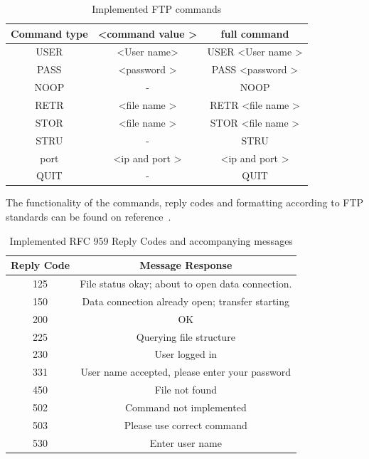\documentclass[journal, a4paper]{IEEEtran}
\begin{document}
\begin{table}[hbtp!]
	\caption{Implemented FTP commands}
	\label{commandTable}
	\begin{center}
		\begin{tabular}{| c | c | c |}
			\hline
			Command type &  \textless command value \textgreater & full command\\
			\hline
				USER & \textless User name\textgreater& USER   \textless User name \textgreater \\
			\hline
				PASS & \textless password \textgreater & PASS   \textless password \textgreater  \\
			\hline
				NOOP & - & NOOP \\
			\hline
				RETR & \textless file name \textgreater & RETR   \textless file name \textgreater \\
			\hline
				STOR & \textless file name \textgreater & STOR   \textless file name \textgreater \\
			\hline
				STRU & -  & STRU  \\
			\hline
				port & \textless ip and port \textgreater & \textless ip and port \textgreater \\
			\hline
				QUIT & -  & QUIT\\
			\hline
		\end{tabular}
	\end{center}
\end{table}

The functionality of the commands, reply codes and formatting according to FTP standards can be found on reference~\cite{rfc959}.

\begin{table}[htbp]
  \centering
  \caption{Implemented RFC 959 Reply Codes and accompanying messages}
    \begin{tabular}{|c|c|}
    \hline
    \multicolumn{1}{|l|}{\textbf{Reply Code}} & \textbf{Message Response} \\
    \hline
    125   & File status okay; about to open data connection. \\
    \hline
    150   & Data connection already open; transfer starting \\
    \hline
    200   & OK \\
    \hline
    225   & Querying file structure \\
    \hline
    230   & User logged in \\
    \hline
    331   & User name accepted, please enter your password \\
    \hline
    450   & File not found \\
    \hline
    502   & Command not implemented \\
    \hline
    503   & Please use correct command \\
    \hline
    530   & Enter user name \\
    \hline
    \end{tabular}%
  \label{replycodes}%
\end{table}%
\end{document}

